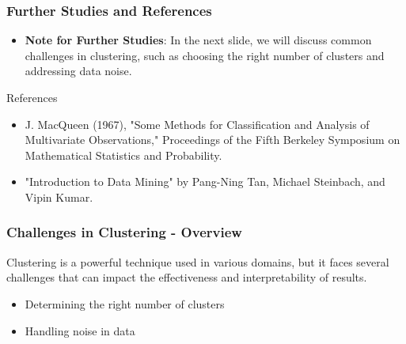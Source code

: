\documentclass{beamer}
\begin{document}
\begin{frame}[fragile]
    \frametitle{Further Studies and References}
    \begin{itemize}
        \item \textbf{Note for Further Studies}: In the next slide, we will discuss common challenges in clustering, such as choosing the right number of clusters and addressing data noise.
    \end{itemize}
    \begin{block}{References}
        \begin{itemize}
            \item J. MacQueen (1967), "Some Methods for Classification and Analysis of Multivariate Observations," Proceedings of the Fifth Berkeley Symposium on Mathematical Statistics and Probability.
            \item "Introduction to Data Mining" by Pang-Ning Tan, Michael Steinbach, and Vipin Kumar.
        \end{itemize}
    \end{block}
\end{frame}

\begin{frame}[fragile]
    \frametitle{Challenges in Clustering - Overview}
    Clustering is a powerful technique used in various domains, but it faces several challenges that can impact the effectiveness and interpretability of results. 
    \begin{itemize}
        \item Determining the right number of clusters
        \item Handling noise in data
    \end{itemize}
\end{frame}
\end{document}
